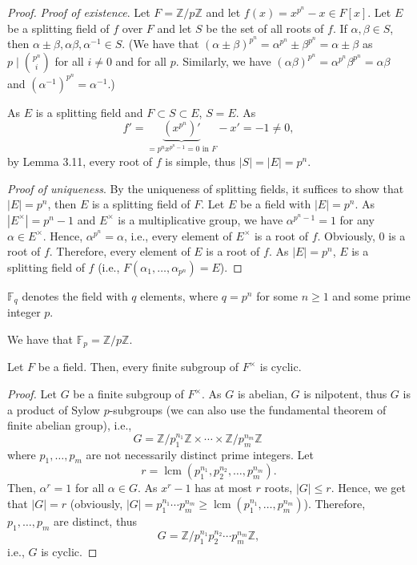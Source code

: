\documentclass[twoside]{article}
\DeclareMathOperator*\lcm{lcm}
\newcommand\Z{\mathbb Z}
\newcommand\F{\mathbb F}
\theoremstyle{remark}
\newcounter{theorem}
\begin{document}
\begin{proof}
  \emph{Proof of existence}. Let \(F = \Z/p\Z\) and let \(f(x) = x^{p^n}-x \in F[x]\). Let \(E\) be a splitting field of \(f\) over \(F\) and let \(S\) be the set of all roots of \(f\). If \(\alpha, \beta \in S\), then \(\alpha \pm \beta, \alpha\beta, \alpha^{-1} \in S\). (We have that \((\alpha \pm \beta)^{p^n} = \alpha^{p^n} \pm \beta^{p^n} = \alpha \pm \beta\) as \(p \mid \binom{p^n}i\) for all \(i \neq 0\) and for all \(p\). Similarly, we have \((\alpha\beta)^{p^n} = \alpha^{p^n} \beta^{p^n} = \alpha\beta\) and \((\alpha^{-1})^{p^n} = \alpha^{-1}\).)
  
  As \(E\) is a splitting field and \(F \subset S \subset E\), \(S=E\). As
  \[ f' = {\underbrace{(x^{p^n})'}_{= p^n x^{p^n-1} = 0 \text{ in \(F\)}}} - x' = -1 \neq 0,  \]
  by Lemma 3.11, every root of \(f\) is simple, thus \(|S| = |E| = p^n\).
  
  \smallskip
  
  \emph{Proof of uniqueness}. By the uniqueness of splitting fields, it suffices to show that \(|E| = p^n\), then \(E\) is a splitting field of \(F\). Let \(E\) be a field with \(|E| = p^n\). As \(|E^\times| = p^n-1\) and \(E^\times\) is a multiplicative group, we have \(\alpha^{p^n-1} = 1\) for any \(\alpha \in E^\times\). Hence, \(\alpha^{p^n} = \alpha\), i.e., every element of \(E^\times\) is a root of \(f\). Obviously, \(0\) is a root of \(f\). Therefore, every element of \(E\) is a root of \(f\). As \(|E| = p^n\), \(E\) is a splitting field of \(f\) (i.e., \(F(\alpha_1, \dots, \alpha_{p^n}) = E\)).
\end{proof}

\begin{definition}
  \(\F_q\) denotes the field with \(q\) elements, where \(q = p^n\) for some \(n \geq 1\) and some prime integer \(p\).
\end{definition}

We have that \(\F_p = \Z/p\Z\).

\begin{lemma}
  Let \(F\) be a field. Then, every finite subgroup of \(F^\times\) is cyclic.
\end{lemma}

\begin{proof}
  Let \(G\) be a finite subgroup of \(F^\times\). As \(G\) is abelian, \(G\) is nilpotent, thus \(G\) is a product of Sylow \(p\)-subgroups (we can also use the fundamental theorem of finite abelian group), i.e.,
  \[ G = \Z/p_1^{n_1}\Z \times \cdots \times \Z/p_m^{n_m}\Z \qquad \]
  where \(p_1, \dots, p_m\) are not necessarily distinct prime integers. Let
  \[ r = \lcm(p_1^{n_1}, p_2^{n_2}, \dots, p_m^{n_m}). \]
  Then, \(\alpha^r=1\) for all \(\alpha \in G\). As \(x^r-1\) has at most \(r\) roots, \(|G|\leq r\). Hence, we get that \(|G| = r\) (obviously, \(|G| = p_1^{n_1} \cdots p_m^{n_m} \geq \lcm(p_1^{n_1}, \dots, p_m^{n_m})\)). Therefore, \(p_1, \dots, p_m\) are distinct, thus
  \[ G = \Z/p_1^{n_1} p_2^{n_2} \cdots p_m^{n_m}\Z, \]
  i.e., \(G\) is cyclic.
\end{proof}
\end{document}
